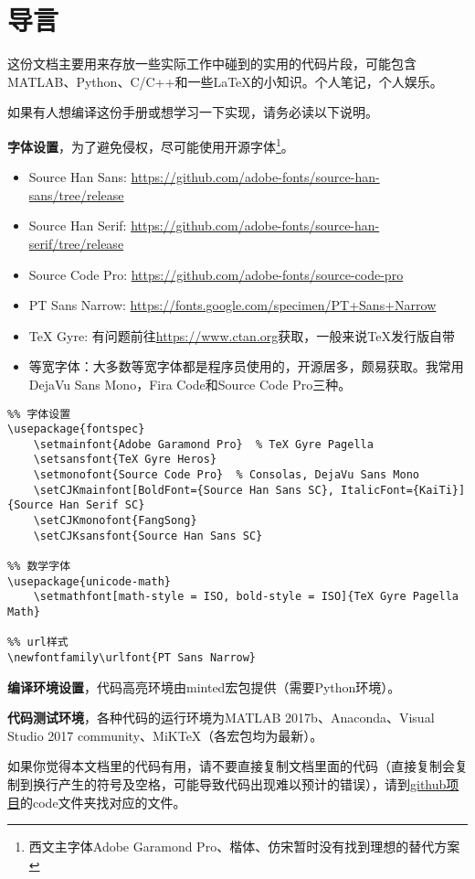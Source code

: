 \chapter*{导言}

这份文档主要用来存放一些实际工作中碰到的实用的代码片段，可能包含MATLAB、Python、C/C++和一些\LaTeX{}的小知识。个人笔记，个人娱乐。

如果有人想编译这份手册或想学习一下实现，请务必读以下说明。

\textbf{字体设置}，为了避免侵权，尽可能使用开源字体\footnote{西文主字体Adobe Garamond Pro、楷体、仿宋暂时没有找到理想的替代方案}。

\begin{itemize}
\item Source Han Sans: \url{https://github.com/adobe-fonts/source-han-sans/tree/release}
\item Source Han Serif: \url{https://github.com/adobe-fonts/source-han-serif/tree/release}
\item Source Code Pro: \url{https://github.com/adobe-fonts/source-code-pro}
\item PT Sans Narrow: \url{https://fonts.google.com/specimen/PT+Sans+Narrow}
\item TeX Gyre: 有问题前往\url{https://www.ctan.org}获取，一般来说\TeX{}发行版自带
\item 等宽字体：大多数等宽字体都是程序员使用的，开源居多，颇易获取。我常用DejaVu Sans Mono，Fira Code和Source Code Pro三种。
\end{itemize}

\begin{verbatim}
%% 字体设置
\usepackage{fontspec}
    \setmainfont{Adobe Garamond Pro}  % TeX Gyre Pagella
    \setsansfont{TeX Gyre Heros}
    \setmonofont{Source Code Pro}  % Consolas, DejaVu Sans Mono
    \setCJKmainfont[BoldFont={Source Han Sans SC}, ItalicFont={KaiTi}]{Source Han Serif SC}
    \setCJKmonofont{FangSong}
    \setCJKsansfont{Source Han Sans SC}

%% 数学字体
\usepackage{unicode-math}
    \setmathfont[math-style = ISO, bold-style = ISO]{TeX Gyre Pagella Math}

%% url样式
\newfontfamily\urlfont{PT Sans Narrow}
\end{verbatim}

\textbf{编译环境设置}，代码高亮环境由minted宏包提供（需要Python环境）。

\textbf{代码测试环境}，各种代码的运行环境为MATLAB 2017b、Anaconda、Visual Studio 2017 community、MiK\TeX{}（各宏包均为最新）。

如果你觉得本文档里的代码有用，请不要直接复制文档里面的代码（直接复制会复制到换行产生的符号及空格，可能导致代码出现难以预计的错误），请到\href{https://github.com/Zousiyu/code_snippet}{github项目}的code文件夹找对应的文件。